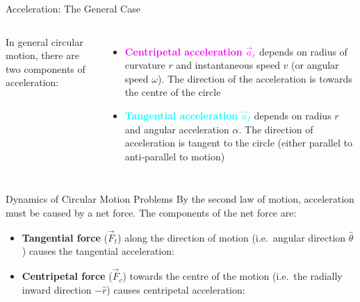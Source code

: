 \documentclass[12pt,compress,aspectratio=169]{beamer}
\begin{document}
\begin{frame}{Acceleration: The General Case}
  \begin{columns}
    
    In general circular motion, there are two components of acceleration:
    \begin{itemize}
    \item\textcolor{magenta}{\textbf{Centripetal acceleration} $\vec a_c$}
      depends on radius of curvature $r$ and instantaneous speed $v$ (or angular
      speed $\omega$). The direction of the acceleration is towards the centre
      of the circle
    \item\textcolor{cyan}{\textbf{Tangential acceleration} $\vec a_t$} depends
      on radius $r$ and angular acceleration $\alpha$. The direction of
      acceleration is tangent to the circle (either parallel to anti-parallel
      to motion)
    \end{itemize}
  \end{columns}
\end{frame}



\begin{frame}{Dynamics of Circular Motion Problems}
  By the second law of motion, acceleration must be caused by a net force.
  The components of the net force are:
  \begin{itemize}
  \item\textbf{Tangential force} ($\vec F_t$) along the direction of motion
    (i.e.\ angular direction $\hat{\theta}$) causes the tangential acceleration:

  \item\textbf{Centripetal force} ($\vec F_c$) towards the centre of the motion
    (i.e.\ the radially inward direction $-\hat{r}$) causes centripetal
    acceleration:

  \end{itemize}
\end{frame}
\end{document}
